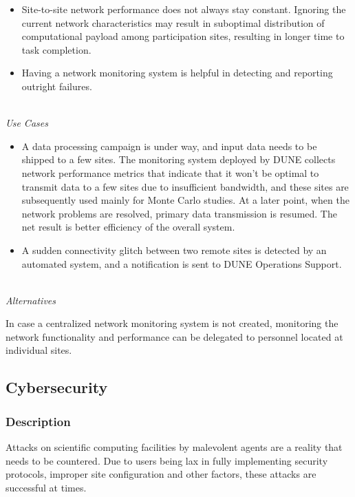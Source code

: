 \begin{itemize}
	
	\item Site-to-site network performance does not always stay constant. Ignoring the current network characteristics 
	may result in suboptimal distribution of computational payload among participation sites, resulting in longer time to task 
	completion.
	
	\item Having a network monitoring system is helpful in detecting and reporting outright failures.
	
\end{itemize}
\ 
\\
\textit{Use Cases}
\begin{itemize}
	\item A data processing campaign is under way, and input data needs to be shipped to a few sites. 
	The monitoring system deployed by DUNE collects network performance metrics that indicate that it
	won't be optimal to transmit data to a few sites due to insufficient bandwidth, and these sites are 
	subsequently used mainly for Monte Carlo studies. At a later point, when the network problems are resolved, primary data transmission is resumed.  The net result is better efficiency of the overall system.
	
	\item A sudden connectivity glitch between two remote sites is detected by an automated system,
	and a  notification is sent to DUNE Operations Support.
\end{itemize}
\ 
\\
\textit{Alternatives}

In case a centralized network monitoring system is not created, monitoring the network
functionality and performance can  be delegated to personnel located at individual sites.

\subsection{Cybersecurity}
\subsubsection{Description}
Attacks on scientific computing facilities by malevolent agents are a reality that needs to be countered. Due to users being lax in fully implementing security protocols, improper site configuration and other factors, these attacks are successful at times.

